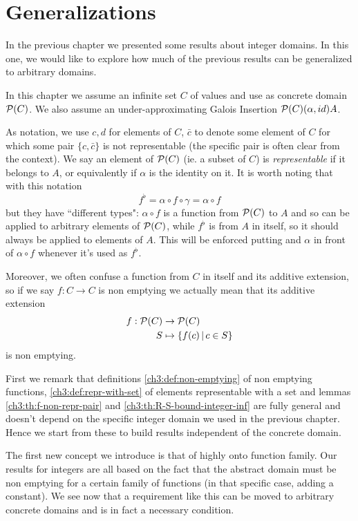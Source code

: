 \chapter{Generalizations}
In the previous chapter we presented some results about integer domains. In this one, we would like to explore how much of the previous results can be generalized to arbitrary domains.

In this chapter we assume an infinite set $C$ of values and use as concrete domain $\mathcal{P}(C)$. We also assume an under-approximating Galois Insertion $\mathcal{P}(C) (\alpha, id) A$.


As notation, we use $c, d$ for elements of $C$, $\bar{c}$ to denote some element of $C$ for which some pair $\{ c, \bar{c} \}$ is not representable (the specific pair is often clear from the context). We say an element of $\mathcal{P}(C)$ (ie. a subset of $C$) is \textit{representable} if it belongs to $A$, or equivalently if $\alpha$ is the identity on it. It is worth noting that with this notation
\[
f^{\flat} = \alpha \circ f \circ \gamma = \alpha \circ f
\]
but they have ``different types": $\alpha \circ f$ is a function from $\mathcal{P}(C)$ to $A$ and so can be applied to arbitrary elements of $\mathcal{P}(C)$, while $f^{\flat}$ is from $A$ in itself, so it should always be applied to elements of $A$. This will be enforced putting and $\alpha$ in front of $\alpha \circ f$ whenever it's used as $f^{\flat}$.

Moreover, we often confuse a function from $C$ in itself and its additive extension, so if we say $f: C \rightarrow C$ is non emptying we actually mean that its additive extension
\begin{align*}
	f: \mathcal{P}(C) &\rightarrow \mathcal{P}(C)	\\
	S & \mapsto \{ f(c) \,\vert\, c \in S \}
\end{align*}
is non emptying.

First we remark that definitions \ref{ch3:def:non-emptying} of non emptying functions, \ref{ch3:def:repr-with-set} of elements representable with a set and lemmas \ref{ch3:th:f-non-repr-pair} and \ref{ch3:th:R-S-bound-integer-inf} are fully general and doesn't depend on the specific integer domain we used in the previous chapter. Hence we start from these to build results independent of the concrete domain.

The first new concept we introduce is that of highly onto function family. Our results for integers are all based on the fact that the abstract domain must be non emptying for a certain family of functions (in that specific case, adding a constant). We see now that a requirement like this can be moved to arbitrary concrete domains and is in fact a necessary condition.

